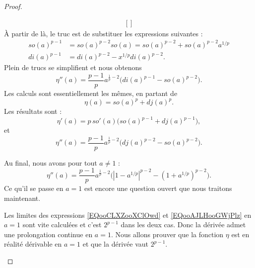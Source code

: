 \begin{proof}
\begin{subproof}
\begin{equation}
\begin{aligned}[]
                \end{aligned}
            \end{equation}
            À partir de là, le truc est de substituer les expressions suivantes :
            \begin{subequations}
                \begin{align}
                    so(a)^{p-1} & =so(a)^{p-2}so(a)=so(a)^{p-2}+so(a)^{p-2}a^{1/p} \\
                    di(a)^{p-1} & =di(a)^{p-2}-x^{1/p}di(a)^{p-2}.
                \end{align}
            \end{subequations}
            Plein de trucs se simplifient et nous obtenons
            \begin{equation}
                \eta''(a)=\frac{ p-1 }{ p }a^{\frac{1}{ p }-2}\big( di(a)^{p-1}-so(a)^{p-2} \big).
            \end{equation}
            \spitem[Pour \( a>1\)]
            Les calculs sont essentiellement les mêmes, en partant de
            \begin{equation}
                \eta(a)=so(a)^p+dj(a)^p.
            \end{equation}
            Les résultats sont :
            \begin{equation}    \label{EQooAJLHooGWjPlz}
                \eta'(a)=p\,so'(a)\big( so(a)^{p-1}+dj(a)^{p-1} \big),
            \end{equation}
            et
            \begin{equation}
                \eta''(a)=\frac{ p-1 }{ p }a^{\frac{1}{ p }-2}\big( dj(a)^{p-2}-so(a)^{p-2} \big).
            \end{equation}
        \end{subproof}
        Au final, nous avons pour tout \( a\neq 1\) :
        \begin{equation}
            \eta''(a)=\frac{ p-1 }{ p }a^{\frac{1}{ p }-2}\big( | 1-a^{1/p} |^{p-2}-(1+a^{1/p})^{p-2} \big).
        \end{equation}
        Ce qu'il se passe en \( a=1\) est encore une question ouvert que nous traitons maintenant.
        \begin{subproof}
            \spitem[Pour \( a=1\)]
            Les limites des expressions \eqref{EQooCLXZooXClOwd} et \eqref{EQooAJLHooGWjPlz} en \( a=1\) sont vite calculées et c'est \( 2^{p-1}\) dans les deux cas. Donc la dérivée admet une prolongation continue en \( a=1\). Nous allons prouver que la fonction \( \eta\) est en réalité dérivable en \( a=1\) et que la dérivée vaut \( 2^{p-1}\).


\end{subproof}
\end{proof}
